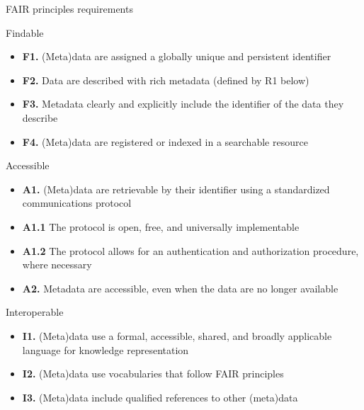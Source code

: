 \begin{frame}[allowframebreaks]{FAIR\autocite{Wilkinson_2016} principles requirements}
	\begin{block}{Findable}
		\begin{itemize}
			\item \textbf{F1.} (Meta)data are assigned a globally unique and persistent identifier
			\item \textbf{F2.} Data are described with rich metadata (defined by R1 below)
			\item \textbf{F3.} Metadata clearly and explicitly include the identifier of the data they describe
			\item \textcolor{UNITSCherry}{\textbf{F4.} (Meta)data are registered or indexed in a searchable resource}
		\end{itemize}
	\end{block}
	
	\framebreak

	\begin{block}{Accessible}
		\begin{itemize}
			\item \textbf{A1.} (Meta)data are retrievable by their identifier using a standardized communications protocol
			\item \textbf{A1.1} The protocol is open, free, and universally implementable
			\item \textbf{A1.2} The protocol allows for an authentication and authorization procedure, where necessary
			\item \textcolor{UNITSCherry}{\textbf{A2.} Metadata are accessible, even when the data are no longer available}
		\end{itemize}
	\end{block}
	
	\framebreak
	
	\begin{block}{Interoperable}
		\begin{itemize}
			\item \textbf{I1.} (Meta)data use a formal, accessible, shared, and broadly applicable language for knowledge representation
			\item \textbf{I2.} (Meta)data use vocabularies that follow FAIR principles
			\item \textbf{I3.} (Meta)data include qualified references to other (meta)data
		\end{itemize}
	\end{block}
	
	\framebreak
	

\end{frame}
